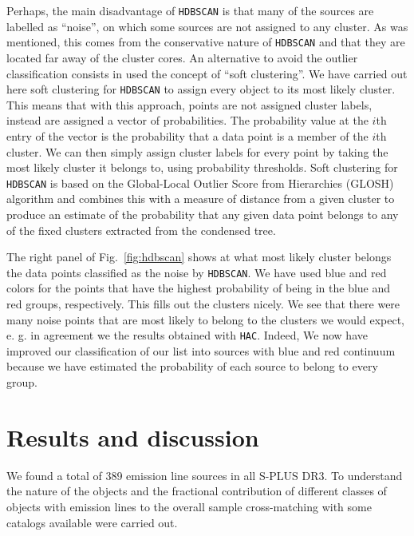 \documentclass[fleqn,usenatbib]{mnras}
\begin{document}
{Perhaps, the main disadvantage of \texttt{HDBSCAN} is that many of the sources are labelled
as ``noise'', on which some sources are not assigned to any cluster. As was mentioned,
this comes from the conservative nature of \texttt{HDBSCAN}
and that they are located far away of the cluster cores. An alternative to avoid the outlier
classification consists in used the concept of ``soft clustering''. We have carried out here soft
clustering for \texttt{HDBSCAN} to assign every object to its most likely cluster.
This means that with this approach, points are not assigned cluster labels, instead are
assigned a vector of probabilities. The probability value at the $i$th entry of the vector
is the probability that a data point is a member of the $i$th cluster. We can then simply
assign cluster labels for every point by taking the most likely cluster it belongs to,
using probability thresholds. Soft clustering for \texttt{HDBSCAN} is based on the
Global-Local Outlier Score from Hierarchies (GLOSH) algorithm \citep{Campello:2015}
and combines this with a
measure of distance from a given cluster to produce an estimate of the probability that any
given data point belongs to any of the fixed clusters extracted from the
condensed tree.

The right panel of Fig.~\ref{fig:hdbscan} shows at what most likely cluster belongs the data
points classified as the noise by \texttt{HDBSCAN}. We have used blue and red colors for the
points that have the highest probability of being in the blue and red groups, respectively.
This fills out the clusters nicely. We see that there were many noise points that are most
likely to belong to the clusters we would expect, e. g. in agreement we the results obtained
with \texttt{HAC}. Indeed, We now have improved our classification of our list into sources
with blue and red continuum because we have estimated the probability of each source to belong
to every group.


\section{Results and discussion}
\label{sec:results}

We found a total of 389 emission line sources in all S-PLUS DR3.
To understand the nature of the objects  and the fractional
contribution of different classes
of objects with emission lines to the overall sample cross-matching
with some catalogs available were carried out.

}
\end{document}
